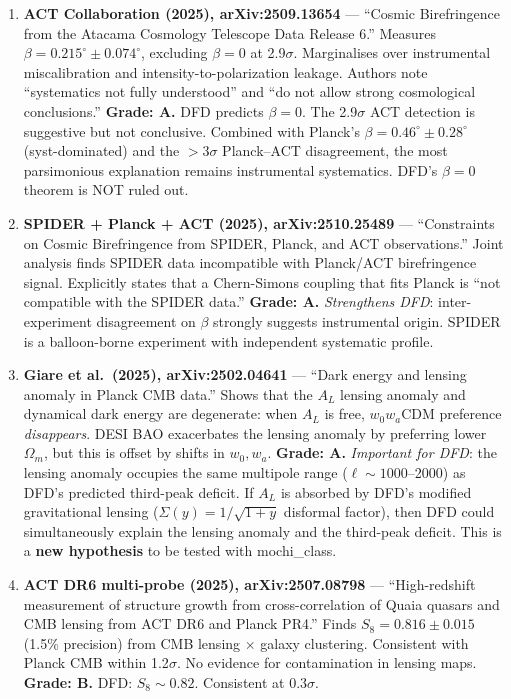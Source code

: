 \documentclass[11pt,a4paper]{article}
\begin{document}
\begin{enumerate}

\item \textbf{ACT Collaboration (2025), arXiv:2509.13654} --- ``Cosmic Birefringence from the Atacama Cosmology Telescope Data Release 6.'' Measures $\beta = 0.215^\circ \pm 0.074^\circ$, excluding $\beta = 0$ at 2.9$\sigma$. Marginalises over instrumental miscalibration and intensity-to-polarization leakage. Authors note ``systematics not fully understood'' and ``do not allow strong cosmological conclusions.'' \textbf{Grade: A.} DFD predicts $\beta = 0$. The 2.9$\sigma$ ACT detection is suggestive but not conclusive. Combined with Planck's $\beta = 0.46^\circ \pm 0.28^\circ$ (syst-dominated) and the $>3\sigma$ Planck--ACT disagreement, the most parsimonious explanation remains instrumental systematics. DFD's $\beta = 0$ theorem is NOT ruled out.

\item \textbf{SPIDER + Planck + ACT (2025), arXiv:2510.25489} --- ``Constraints on Cosmic Birefringence from SPIDER, Planck, and ACT observations.'' Joint analysis finds SPIDER data incompatible with Planck/ACT birefringence signal. Explicitly states that a Chern-Simons coupling that fits Planck is ``not compatible with the SPIDER data.'' \textbf{Grade: A.} \emph{Strengthens DFD}: inter-experiment disagreement on $\beta$ strongly suggests instrumental origin. SPIDER is a balloon-borne experiment with independent systematic profile.

\item \textbf{Giare et al.\ (2025), arXiv:2502.04641} --- ``Dark energy and lensing anomaly in Planck CMB data.'' Shows that the $A_L$ lensing anomaly and dynamical dark energy are degenerate: when $A_L$ is free, $w_0w_a$CDM preference \emph{disappears}. DESI BAO exacerbates the lensing anomaly by preferring lower $\Omega_m$, but this is offset by shifts in $w_0, w_a$. \textbf{Grade: A.} \emph{Important for DFD}: the lensing anomaly occupies the same multipole range ($\ell \sim 1000$--2000) as DFD's predicted third-peak deficit. If $A_L$ is absorbed by DFD's modified gravitational lensing ($\Sigma(y) = 1/\sqrt{1+y}$ disformal factor), then DFD could simultaneously explain the lensing anomaly and the third-peak deficit. This is a \textbf{new hypothesis} to be tested with mochi\_class.

\item \textbf{ACT DR6 multi-probe (2025), arXiv:2507.08798} --- ``High-redshift measurement of structure growth from cross-correlation of Quaia quasars and CMB lensing from ACT DR6 and Planck PR4.'' Finds $S_8 = 0.816 \pm 0.015$ (1.5\% precision) from CMB lensing $\times$ galaxy clustering. Consistent with Planck CMB within 1.2$\sigma$. No evidence for contamination in lensing maps. \textbf{Grade: B.} DFD: $S_8 \sim 0.82$. Consistent at $0.3\sigma$.

\end{enumerate}
\end{document}

